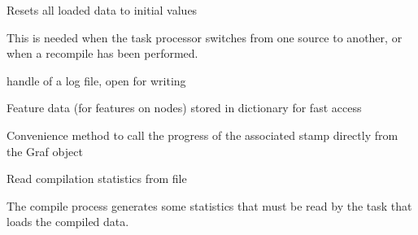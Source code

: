 \documentclass[letterpaper,10pt,english]{sphinxmanual}
\begin{document}
\begin{fulllineitems}
\begin{fulllineitems}
\end{fulllineitems}


\begin{fulllineitems}
\label{graf/graf:graf.graf.Graf.init_data}
Resets all loaded data to initial values

This is needed when the task processor switches from one source to another,
or when a recompile has been performed.

\end{fulllineitems}


\begin{fulllineitems}
\label{graf/graf:graf.graf.Graf.log}
handle of a log file, open for writing

\end{fulllineitems}


\begin{fulllineitems}
\label{graf/graf:graf.graf.Graf.node_feat}
Feature data (for features on nodes) stored in dictionary for fast access

\end{fulllineitems}


\begin{fulllineitems}
\label{graf/graf:graf.graf.Graf.progress}
Convenience method to call the progress of the associated stamp directly from the Graf object

\end{fulllineitems}


\begin{fulllineitems}
\label{graf/graf:graf.graf.Graf.read_stats}
Read compilation statistics from file

The compile process generates some statistics that must be read by the task that loads the compiled data.

\end{fulllineitems}


\end{fulllineitems}
\end{document}
